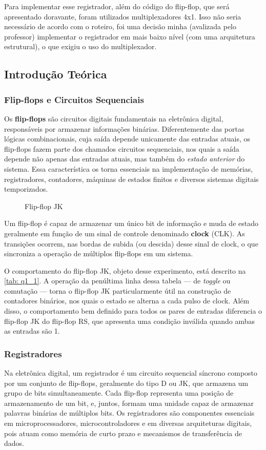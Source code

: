 \documentclass[a4paper,12pt]{article}
\begin{document}
Para implementar esse registrador, além do código do flip-flop, que será apresentado doravante, foram utilizados multiplexadores 4x1. Isso não seria necessário de acordo com o roteiro, foi uma decisão minha (avalizada pelo professor) implementar o registrador em mais baixo nível (com uma arquitetura estrutural), o que exigiu o uso do multiplexador.

\subsection{Introdução Teórica}

\subsubsection{Flip-flops e Circuitos Sequenciais}
Os \textbf{flip-flops} são circuitos digitais fundamentais na eletrônica digital, responsáveis por armazenar informações binárias. Diferentemente das portas lógicas combinacionais, cuja saída depende unicamente das entradas atuais, os flip-flops fazem parte dos chamados circuitos sequenciais, nos quais a saída depende não apenas das entradas atuais, mas também do \textit{estado anterior} do sistema. Essa característica os torna essenciais na implementação de memórias, registradores, contadores, máquinas de estados finitos e diversos sistemas digitais temporizados.

\begin{figure}[H]
    \centering
    
    \caption{Flip-flop JK}
    \label{fig:enter-label}
\end{figure}
Um flip-flop é capaz de armazenar um único bit de informação e muda de estado geralmente em função de um sinal de controle denominado \textbf{clock} (CLK). As transições ocorrem, nas bordas de subida (ou descida) desse sinal de clock, o que sincroniza a operação de múltiplos flip-flops em um sistema.

O comportamento do flip-flop JK, objeto desse experimento, está descrito na \autoref{tab: q1_1}. A operação da penúltima linha dessa tabela — de \textit{toggle} ou comutação — torna o flip-flop JK particularmente útil na construção de contadores binários, nos quais o estado se alterna a cada pulso de clock. Além disso, o comportamento bem definido para todos os pares de entradas diferencia o flip-flop JK do flip-flop RS, que apresenta uma condição inválida quando ambas as entradas são 1.

\subsubsection{Registradores}
Na eletrônica digital, um registrador é um circuito sequencial síncrono composto por um conjunto de flip-flops, geralmente do tipo D ou JK, que armazena um grupo de bits simultaneamente. Cada flip-flop representa uma posição de armazenamento de um bit, e, juntos, formam uma unidade capaz de armazenar palavras binárias de múltiplos bits. Os registradores são componentes essenciais em microprocessadores, microcontroladores e em diversas arquiteturas digitais, pois atuam como memória de curto prazo e mecanismos de transferência de dados.
\end{document}
